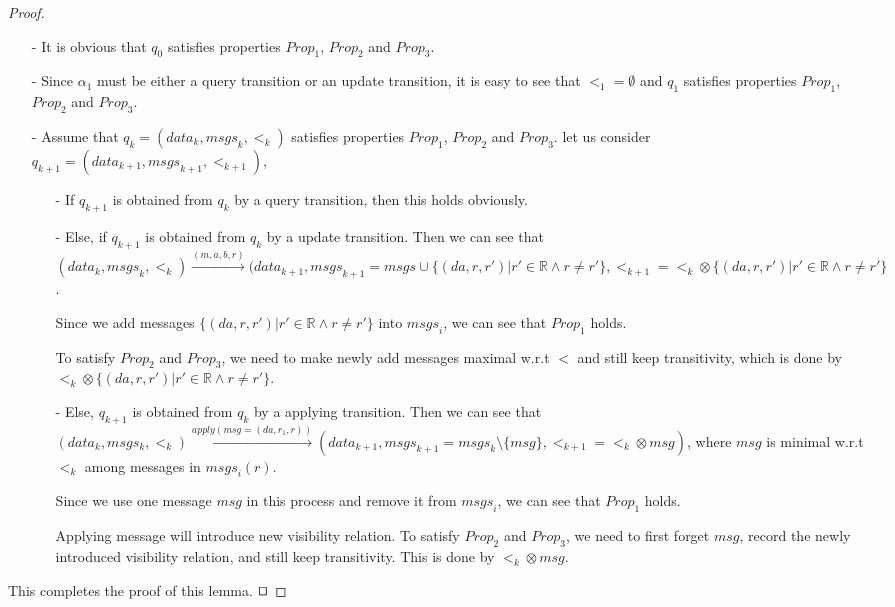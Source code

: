 \begin {proof}
\begin{itemize}
\setlength{\itemsep}{0.5pt}
\item[-] It is obvious that $q_0$ satisfies properties $\mathit{Prop}_1$, $\mathit{Prop}_2$ and $\mathit{Prop}_3$.

\item[-] Since $\alpha_1$ must be either a query transition or an update transition, it is easy to see that $<_1 = \emptyset$ and $q_1$ satisfies properties $\mathit{Prop}_1$, $\mathit{Prop}_2$ and $\mathit{Prop}_3$.

\item[-] Assume that $q_k=(\mathit{data}_k,\mathit{msgs}_k,<_k)$ satisfies properties $\mathit{Prop}_1$, $\mathit{Prop}_2$ and $\mathit{Prop}_3$. let us consider $q_{k+1}= (\mathit{data}_{k+1},\mathit{msgs}_{k+1},<_{k+1})$,

    \begin{itemize}
    \setlength{\itemsep}{0.5pt}
    \item[-] If $q_{k+1}$ is obtained from $q_k$ by a query transition, then this holds obviously.

    \item[-] Else, if $q_{k+1}$ is obtained from $q_k$ by a update transition. Then we can see that $(\mathit{data}_k,\mathit{msgs}_k,<_k) {\xrightarrow{(m,a,b,r)}} (\mathit{data}_{k+1},\mathit{msgs}_{k+1}= \mathit{msgs} \cup \{ (\mathit{da},r,r') \vert  r' \in \mathbb{R} \wedge r \neq r' \},<_{k+1} = <_k \otimes \{ (\mathit{da},r,r') \vert  r' \in \mathbb{R} \wedge r \neq r' \}$.

        Since we add messages $\{ (\mathit{da},r,r') \vert  r' \in \mathbb{R} \wedge r \neq r' \}$ into $\mathit{msgs}_i$, we can see that $\mathit{Prop}_1$ holds.

        To satisfy $\mathit{Prop}_2$ and $\mathit{Prop}_3$, we need to make newly add messages maximal w.r.t $<$ and still keep transitivity, which is done by $<_k \otimes \{ (\mathit{da},r,r') \vert  r' \in \mathbb{R} \wedge r \neq r' \}$.

    \item[-] Else, $q_{k+1}$ is obtained from $q_k$ by a applying transition. Then we can see that $(\mathit{data}_k,msgs_k,<_k) {\xrightarrow{apply(\mathit{msg}=(\mathit{da},r_1,r))}} (\mathit{data}_{k+1},\mathit{msgs}_{k+1} = \mathit{msgs}_k \setminus \{ \mathit{msg} \}, <_{k+1} = <_k \otimes \mathit{msg} )$, where $\mathit{msg}$ is minimal w.r.t $<_k$ among messages in $\mathit{msgs}_i(r)$.

        Since we use one message $\mathit{msg}$ in this process and remove it from $\mathit{msgs}_i$, we can see that $\mathit{Prop}_1$ holds.

        Applying message will introduce new visibility relation. To satisfy $\mathit{Prop}_2$ and $\mathit{Prop}_3$, we need to first forget $\mathit{msg}$, record the newly introduced visibility relation, and still keep transitivity. This is done by $<_k \otimes \mathit{msg}$.
    \end{itemize}
\end{itemize}

This completes the proof of this lemma. $\qed$
\end {proof}
